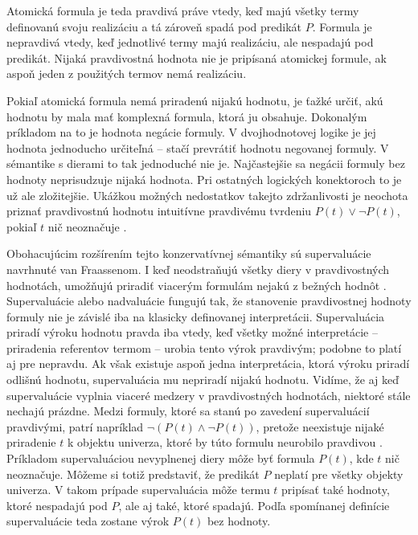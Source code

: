 \documentclass[12pt, letterpaper]{article}
\begin{document}
\noindent Atomická formula je teda pravdivá práve vtedy, keď majú všetky termy definovanú svoju realizáciu a tá zároveň spadá pod predikát $P$. Formula je nepravdivá vtedy, keď jednotlivé termy majú realizáciu, ale nespadajú pod predikát. Nijaká pravdivostná hodnota nie je pripísaná atomickej formule, ak aspoň jeden z použitých termov nemá realizáciu.\par 
Pokiaľ atomická formula nemá priradenú nijakú hodnotu, je ťažké určiť, akú hodnotu by mala mať komplexná formula, ktorá ju obsahuje. Dokonalým príkladom na to je hodnota negácie formuly. V dvojhodnotovej logike je jej hodnota jednoducho určiteľná -- stačí prevrátiť hodnotu negovanej formuly. V sémantike s dierami to tak jednoduché nie je. Najčastejšie sa negácii formuly bez hodnoty neprisudzuje nijaká hodnota. Pri ostatných logických konektoroch to je už ale zložitejšie. Ukážkou možných nedostatkov takejto zdržanlivosti je neochota priznať pravdivostnú hodnotu intuitívne pravdivému tvrdeniu $P(t) \lor \neg P(t)$, pokiaľ $t$ nič neoznačuje \parencites[228]{Lehmann2002}[14]{Morscher2001}{sep-logic-free}[9485]{Rami2020}[943]{Woodruff}.\par
Obohacujúcim rozšírením tejto konzervatívnej sémantiky sú supervaluácie navrhnuté van Fraassenom. I keď neodstraňujú všetky diery v pravdivostných hodnotách, umožňujú priradiť viacerým formulám nejakú z bežných hodnôt \parencites[158]{Dumitru2015}[228]{Lehmann2002}{sep-logic-free}.
Supervaluácie alebo nadvaluácie fungujú tak, že stanovenie pravdivostnej hodnoty formuly nie je závislé iba na klasicky definovanej interpretácii. Supervaluácia priradí výroku hodnotu pravda iba vtedy, keď všetky možné interpretácie -- priradenia referentov termom -- urobia tento výrok pravdivým; podobne to platí aj pre nepravdu. Ak však existuje aspoň jedna interpretácia, ktorá výroku priradí odlišnú hodnotu, supervaluácia mu nepriradí nijakú hodnotu. Vidíme, že aj keď supervaluácie vyplnia viaceré medzery v pravdivostných hodnotách, niektoré stále nechajú prázdne. Medzi formuly, ktoré sa stanú po zavedení supervaluácií pravdivými, patrí napríklad $\neg (P(t) \land \neg P(t))$, pretože neexistuje nijaké priradenie $t$ k objektu univerza, ktoré by túto formulu neurobilo pravdivou \parencites[20]{Dvorak}{sep-logic-free}[487]{Fraassen}. Príkladom supervaluáciou nevyplnenej diery môže byť formula $P(t)$, kde $t$ nič neoznačuje. Môžeme si totiž predstaviť, že predikát $P$ neplatí pre všetky objekty univerza. V takom prípade supervaluácia môže termu $t$ pripísať také hodnoty, ktoré nespadajú pod $P$, ale aj také, ktoré spadajú. Podľa spomínanej definície supervaluácie teda zostane výrok $P(t)$ bez hodnoty.\par
\end{document}
